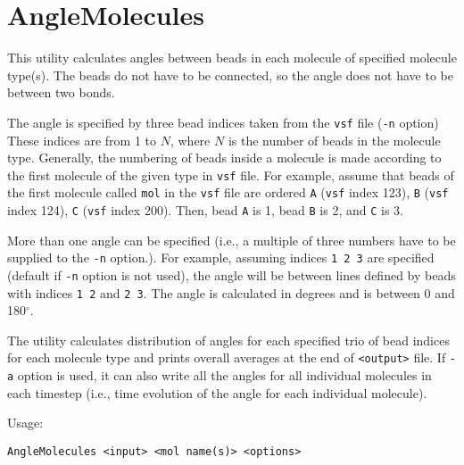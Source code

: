 \section{AngleMolecules} \label{sec:AngleMolecules}

This utility calculates angles between beads in each molecule of specified
molecule type(s). The beads do not have to be connected, so the angle does
not have to be between two bonds.

The angle is specified by three bead indices taken from the \texttt{vsf}
file (\texttt{-n} option) These indices are from 1 to $N$, where $N$ is the
number of beads in the molecule type. Generally, the numbering of beads
inside a molecule is made according to the first molecule of the given type
in \texttt{vsf} file. For example, assume that beads of the first molecule
called \texttt{mol} in the \texttt{vsf} file are ordered \texttt{A}
(\texttt{vsf} index 123), \texttt{B} (\texttt{vsf} index 124), \texttt{C}
(\texttt{vsf} index 200). Then, bead \texttt{A} is 1, bead \texttt{B} is 2,
and \texttt{C} is 3.

More than one angle can be specified
(i.e., a multiple of three numbers have to be supplied to the \texttt{-n}
option.). For example, assuming indices \texttt{1 2 3} are specified
(default if \texttt{-n} option is not used), the angle will be between
lines defined by beads with indices \texttt{1 2} and \texttt{2 3}. The
angle is calculated in degrees and is between 0 and 180$^{\circ}$.

The utility calculates distribution of angles for each specified trio of
bead indices for each molecule type and prints overall averages at the end
of \texttt{<output>} file. If \texttt{-a} option is used, it can also write
all the angles for all individual molecules in each timestep (i.e., time
evolution of the angle for each individual molecule).

Usage:

\vspace{1em}
\noindent
\texttt{AngleMolecules <input> <mol name(s)> <options>}

